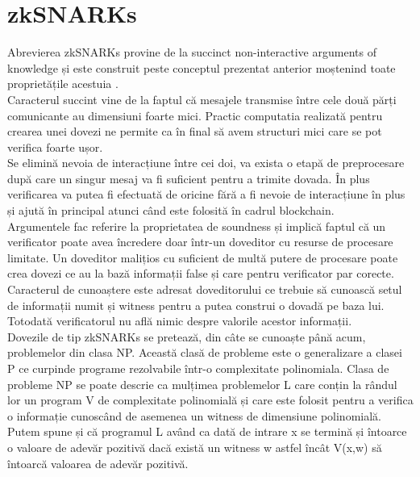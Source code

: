 \section{zkSNARKs}

Abrevierea zkSNARKs provine de la succinct non-interactive arguments of knowledge și este construit peste conceptul prezentat anterior moștenind toate proprietățile acestuia \cite{ZKS_Crypto_Basic2}.\\

Caracterul succint vine de la faptul că mesajele transmise între cele două părți comunicante au dimensiuni foarte mici. Practic computatia realizată pentru crearea unei dovezi ne permite ca în final să avem structuri mici care se pot verifica foarte ușor. \\

Se elimină nevoia de interacțiune între cei doi, va exista o etapă de preprocesare după care un singur mesaj va fi suficient pentru a trimite dovada. În plus verificarea va putea fi efectuată de oricine fără a fi nevoie de interacțiune în plus și ajută în principal atunci când este folosită în cadrul blockchain.\\

Argumentele fac referire la proprietatea de soundness și implică faptul că un verificator poate avea încredere doar într-un doveditor cu resurse de procesare limitate. Un doveditor malițios cu suficient de multă putere de procesare poate crea dovezi ce au la bază informații false și care pentru verificator par corecte.\\

Caracterul de cunoaștere este adresat doveditorului ce trebuie să cunoască setul de informații numit și witness pentru a putea construi o dovadă pe baza lui.
Totodată verificatorul nu află nimic despre valorile acestor informații.\\

Dovezile de tip zkSNARKs se pretează, din câte se cunoaște până acum, problemelor din clasa NP. Această clasă de probleme este o generalizare a clasei P ce curpinde programe rezolvabile într-o complexitate polinomiala. Clasa de probleme NP se poate descrie ca mulțimea problemelor L care conțin la rândul lor un program V de complexitate polinomială și care este folosit pentru a verifica o informație cunoscând de asemenea un witness de dimensiune polinomială. Putem spune și că programul L având ca dată de intrare x se termină și întoarce o valoare de adevăr pozitivă dacă există un witness w astfel încât V(x,w) să întoarcă valoarea de adevăr pozitivă. \\

